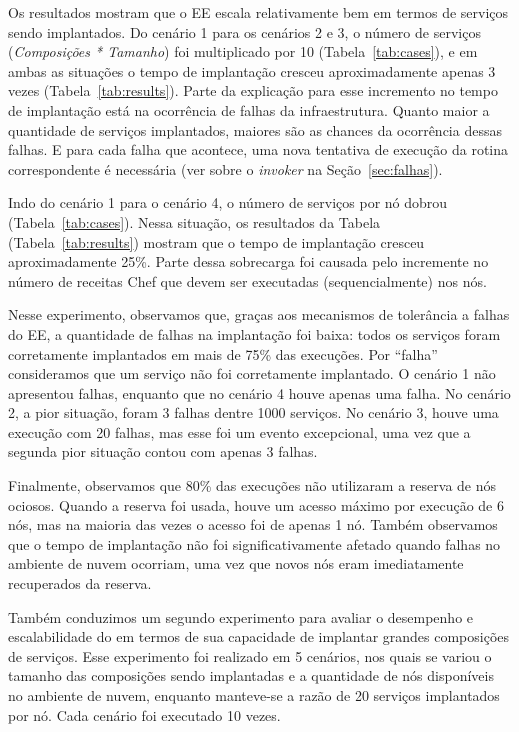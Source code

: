 Os resultados mostram que o EE escala relativamente bem em termos de serviços sendo implantados.
Do cenário 1 para os cenários 2 e 3, o número de serviços (\emph{Composições * Tamanho}) 
foi multiplicado por 10 (Tabela~\ref{tab:cases}),
e em ambas as situações o tempo de implantação cresceu aproximadamente apenas 3 vezes
(Tabela~\ref{tab:results}). 
Parte da explicação para esse incremento no tempo de implantação
está na ocorrência de falhas da infraestrutura.
Quanto maior a quantidade de serviços implantados, 
maiores são as chances da ocorrência dessas falhas.
E para cada falha que acontece, uma nova tentativa de execução
da rotina correspondente é necessária 
(ver sobre o \emph{invoker} na Seção~\ref{sec:falhas}).

Indo do cenário 1 para o cenário 4, o número de serviços por nó dobrou
(Tabela~\ref{tab:cases}). Nessa situação, os resultados da Tabela (Tabela~\ref{tab:results}) 
mostram que o tempo de implantação cresceu aproximadamente 25\%. Parte dessa sobrecarga foi causada
pelo incremente no número de receitas Chef que devem ser executadas (sequencialmente) nos nós.

Nesse experimento, observamos que, graças aos mecanismos de tolerância a falhas do EE,
a quantidade de falhas na implantação foi baixa: todos os serviços foram corretamente implantados em mais
de 75\% das execuções.
Por ``falha'' consideramos que um serviço não foi corretamente implantado.
O cenário 1 não apresentou falhas,
enquanto que no cenário 4 houve apenas uma falha.
No cenário 2, a pior situação, foram 3 falhas dentre 1000 serviços.
No cenário 3, houve uma execução com 20 falhas, mas esse foi um evento excepcional,
uma vez que a segunda pior situação contou com apenas 3 falhas.

Finalmente, observamos que 80\% das execuções não utilizaram a reserva de nós ociosos.
Quando a reserva foi usada, houve um acesso máximo por execução de 6 nós,
mas na maioria das vezes o acesso foi de apenas 1 nó.
Também observamos que o tempo de implantação não foi significativamente afetado
quando falhas no ambiente de nuvem ocorriam,
uma vez que novos nós eram imediatamente recuperados da reserva.



Também conduzimos um segundo experimento para avaliar o desempenho e escalabilidade do \ee
em termos de sua capacidade de implantar grandes composições de serviços.
Esse experimento foi realizado em 5 cenários, nos quais se variou o tamanho das composições sendo implantadas
e a quantidade de nós disponíveis no ambiente de nuvem, enquanto manteve-se a razão de 20 serviços implantados por nó.
Cada cenário foi executado 10 vezes.

